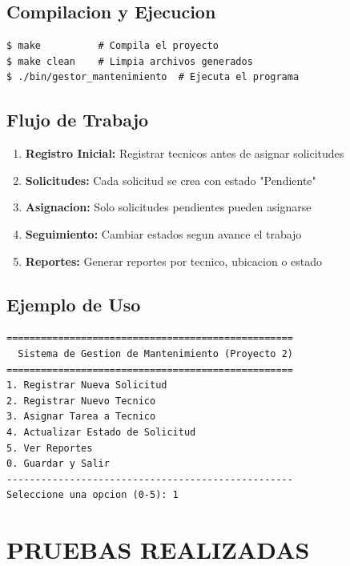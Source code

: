 \documentclass[12pt, a4paper]{article}
\begin{document}
\subsection{Compilacion y Ejecucion}
\begin{verbatim}
$ make          # Compila el proyecto
$ make clean    # Limpia archivos generados
$ ./bin/gestor_mantenimiento  # Ejecuta el programa
\end{verbatim}

\subsection{Flujo de Trabajo}
\begin{enumerate}[left=0pt]
\item \textbf{Registro Inicial:} Registrar tecnicos antes de asignar solicitudes
\item \textbf{Solicitudes:} Cada solicitud se crea con estado "Pendiente"
\item \textbf{Asignacion:} Solo solicitudes pendientes pueden asignarse
\item \textbf{Seguimiento:} Cambiar estados segun avance el trabajo
\item \textbf{Reportes:} Generar reportes por tecnico, ubicacion o estado
\end{enumerate}

\subsection{Ejemplo de Uso}
\begin{verbatim}
==================================================
  Sistema de Gestion de Mantenimiento (Proyecto 2)
==================================================
1. Registrar Nueva Solicitud
2. Registrar Nuevo Tecnico
3. Asignar Tarea a Tecnico
4. Actualizar Estado de Solicitud
5. Ver Reportes
0. Guardar y Salir
--------------------------------------------------
Seleccione una opcion (0-5): 1
\end{verbatim}

\section{PRUEBAS REALIZADAS}
\end{document}
